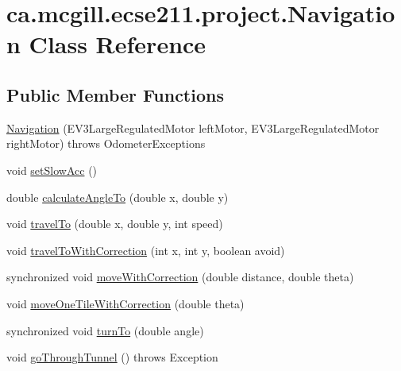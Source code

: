 \hypertarget{classca_1_1mcgill_1_1ecse211_1_1project_1_1_navigation}{}\section{ca.\+mcgill.\+ecse211.\+project.\+Navigation Class Reference}
\label{classca_1_1mcgill_1_1ecse211_1_1project_1_1_navigation}
\subsection*{Public Member Functions}
\begin{DoxyCompactItemize}
\item 
\hyperlink{classca_1_1mcgill_1_1ecse211_1_1project_1_1_navigation_aaee14b67c392ddd951e3ce21224c3e56}{Navigation} (E\+V3\+Large\+Regulated\+Motor left\+Motor, E\+V3\+Large\+Regulated\+Motor right\+Motor)  throws Odometer\+Exceptions 
\item 
void \hyperlink{classca_1_1mcgill_1_1ecse211_1_1project_1_1_navigation_ab01db7b8a871acd45e7dd16922abc15e}{set\+Slow\+Acc} ()
\item 
double \hyperlink{classca_1_1mcgill_1_1ecse211_1_1project_1_1_navigation_a4376e54162df8f123ca3b52e4fd2f38d}{calculate\+Angle\+To} (double x, double y)
\item 
void \hyperlink{classca_1_1mcgill_1_1ecse211_1_1project_1_1_navigation_a3d8354490a2d8c36090d794c25d33421}{travel\+To} (double x, double y, int speed)
\item 
void \hyperlink{classca_1_1mcgill_1_1ecse211_1_1project_1_1_navigation_ae7230e905494002087416294f12cae6a}{travel\+To\+With\+Correction} (int x, int y, boolean avoid)
\item 
synchronized void \hyperlink{classca_1_1mcgill_1_1ecse211_1_1project_1_1_navigation_a48eeb9ae2da23664421e8da5642054c7}{move\+With\+Correction} (double distance, double theta)
\item 
void \hyperlink{classca_1_1mcgill_1_1ecse211_1_1project_1_1_navigation_afbe677941e2bd44e35452e1eff508ae9}{move\+One\+Tile\+With\+Correction} (double theta)
\item 
synchronized void \hyperlink{classca_1_1mcgill_1_1ecse211_1_1project_1_1_navigation_a3bbe0645f2b3b3d0986b4a707fb5a00c}{turn\+To} (double angle)
\item 
void \hyperlink{classca_1_1mcgill_1_1ecse211_1_1project_1_1_navigation_a4b52e605d3ea2f9bcd9481ae2c69ba39}{go\+Through\+Tunnel} ()  throws Exception 

\end{DoxyCompactItemize}
